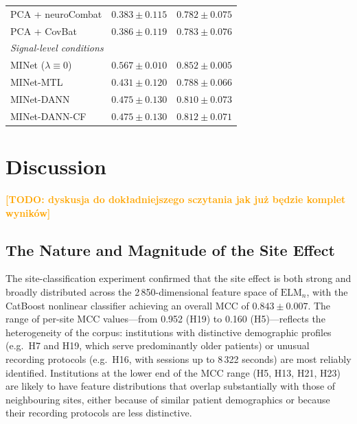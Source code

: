 \documentclass[preprint,12pt]{elsarticle}
\newcommand{\td}[1]{\textcolor{orange}{\textbf{[TODO: #1]}}}
\begin{document}
\begin{table}[htbp]
\begin{tabular}{lcc}
    \quad PCA + neuroCombat
      & $0.383 \pm 0.115$ & $0.782 \pm 0.075$ \\
    \quad PCA + CovBat
      & $0.386 \pm 0.119$ & $0.783 \pm 0.076$ \\
    \midrule
    \multicolumn{3}{l}{\textit{Signal-level conditions}} \\
    \quad MINet ($\lambda \equiv 0$)
      & $0.567  \pm 0.010$ & $0.852 \pm 0.005$ \\
    \quad MINet-MTL
      & $0.431 \pm 0.120$ & $0.788 \pm 0.066$ \\
    \quad MINet-DANN
      & $0.475 \pm 0.130$& $0.810 \pm 0.073$ \\
    \quad MINet-DANN-CF
      & $0.475 \pm 0.130$ & $0.812 \pm 0.071$ \\
    \bottomrule
  \end{tabular}
\end{table}

\section{Discussion}
\label{sec:discussion}
\td{dyskusja do dokładniejszego sczytania jak już będzie komplet wyników}
\subsection{The Nature and Magnitude of the Site Effect}
\label{subsec:disc_site_effect}

The site-classification experiment confirmed that the site effect is
both strong and broadly distributed across the 2\,850-dimensional
feature space of $\mathrm{ELM}_n$, with the CatBoost nonlinear
classifier achieving an overall MCC of $0.843 \pm 0.007$.
The range of per-site MCC values---from 0.952 (H19) to 0.160
(H5)---reflects the heterogeneity of the corpus: institutions with
distinctive demographic profiles (e.g.\ H7 and H19, which serve
predominantly older patients) or unusual recording protocols
(e.g.\ H16, with sessions up to 8\,322 seconds) are most reliably
identified.
Institutions at the lower end of the MCC range (H5, H13, H21, H23)
are likely to have feature distributions that overlap substantially
with those of neighbouring sites, either because of similar patient
demographics or because their recording protocols are less
distinctive.
\end{document}
